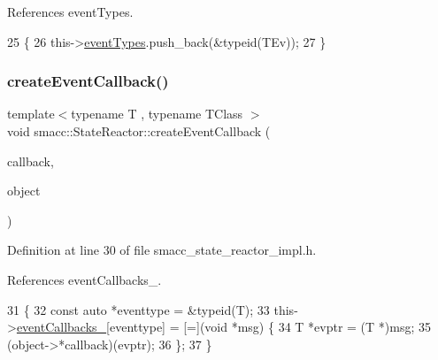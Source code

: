 References event\+Types.


\begin{DoxyCode}
25 \{
26     this->\hyperlink{classsmacc_1_1StateReactor_a65c8ddfce40e7859e5c73fff1cf6c04b}{eventTypes}.push\_back(&\textcolor{keyword}{typeid}(TEv));
27 \}
\end{DoxyCode}
\mbox{\label{classsmacc_1_1StateReactor_a68482e08f6449694a0bcda843b14b376}} 
\subsubsection{\texorpdfstring{create\+Event\+Callback()}{createEventCallback()}\hspace{0.1cm}{\footnotesize\ttfamily [1/2]}}
{\footnotesize\ttfamily template$<$typename T , typename T\+Class $>$ \\
void smacc\+::\+State\+Reactor\+::create\+Event\+Callback (\begin{DoxyParamCaption}\item[{void(T\+Class\+::$\ast$)(T $\ast$)}]{callback,  }\item[{T\+Class $\ast$}]{object }\end{DoxyParamCaption})}



Definition at line 30 of file smacc\+\_\+state\+\_\+reactor\+\_\+impl.\+h.



References event\+Callbacks\+\_\+.


\begin{DoxyCode}
31 \{
32     \textcolor{keyword}{const} \textcolor{keyword}{auto} *eventtype = &\textcolor{keyword}{typeid}(T);
33     this->\hyperlink{classsmacc_1_1StateReactor_a63cce05c412f3699cc1b15af9aeaf8af}{eventCallbacks\_}[eventtype] = [=](\textcolor{keywordtype}{void} *msg) \{
34         T *evptr = (T *)msg;
35         (\textcolor{keywordtype}{object}->*callback)(evptr);
36     \};
37 \}
\end{DoxyCode}
\mbox{\label{classsmacc_1_1StateReactor_ac6b3a604009e5a68123aed27e70cf2be}} 
